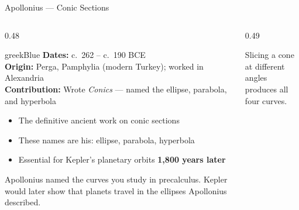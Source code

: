 \begin{frame}[shrink=25]{Apollonius --- Conic Sections}

  \begin{columns}[T]
    \begin{column}{0.48\textwidth}
      \begin{personbox}{greekBlue}
        \small
        \textbf{Dates:} c.\ 262 -- c.\ 190 BCE\\
        \textbf{Origin:} Perga, Pamphylia (modern Turkey); worked in Alexandria\\
        \textbf{Contribution:} Wrote \emph{Conics} --- named the ellipse, parabola, and hyperbola
      \end{personbox}

      \vspace{0.4em}
      \begin{itemize}
        \item The definitive ancient work on conic sections
        \item \alert{These names are his}: ellipse, parabola, hyperbola
        \item Essential for Kepler's planetary orbits \textbf{1,800 years later}
      \end{itemize}

      \vspace{0.3em}
      \begin{insightbox}
        Apollonius named the curves you study in precalculus.
        Kepler would later show that planets travel in the ellipses Apollonius described.
      \end{insightbox}
    \end{column}

    \begin{column}{0.49\textwidth}

      \vspace{0.3em}
      {\small\centering Slicing a cone at different angles\\produces all four curves.}
    \end{column}
  \end{columns}

\end{frame}

